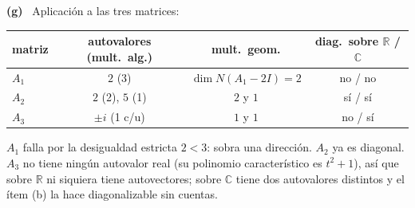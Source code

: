 \documentclass[11pt,a4paper]{article}
\newcommand{\R}{\mathbb{R}}
\newcommand{\Cx}{\mathbb{C}}
\newcommand{\itemsol}[1]{\par\medskip\noindent\textbf{(#1)}\ \ignorespaces}
\begin{document}
\itemsol{g} Aplicación a las tres matrices:
\begin{center}
\begin{tabular}{@{}lccc@{}}
\hline
matriz & autovalores (mult.\ alg.) & mult.\ geom. & diag.\ sobre $\R$ / $\Cx$\\
\hline
$A_1$ & $2$ (3) & $\dim N(A_1-2I)=2$ & no / no\\
$A_2$ & $2$ (2), $5$ (1) & $2$ y $1$ & sí / sí\\
$A_3$ & $\pm i$ (1 c/u) & $1$ y $1$ & no / sí\\
\hline
\end{tabular}
\end{center}
$A_1$ falla por la desigualdad estricta $2<3$: sobra una dirección. $A_2$ ya es
diagonal. $A_3$ no tiene ningún autovalor real (su polinomio característico es
$t^2+1$), así que sobre $\R$ ni siquiera tiene autovectores; sobre $\Cx$ tiene
dos autovalores distintos y el ítem (b) la hace diagonalizable sin cuentas.
\end{document}
